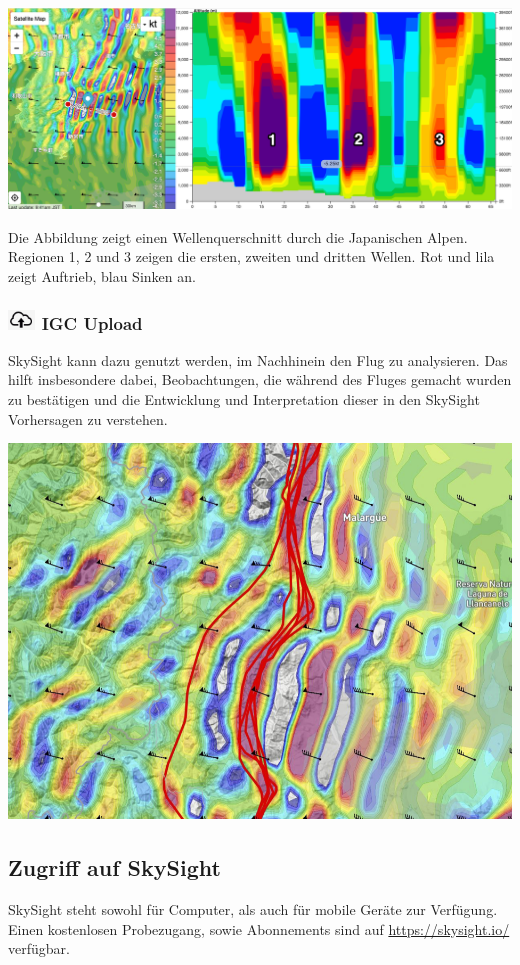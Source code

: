 \documentclass[9pt,a4paper,twocolumn]{article}
\begin{document}
\includegraphics[width=\linewidth]{images/wave_x-section.png}

Die Abbildung zeigt einen Wellenquerschnitt durch die Japanischen Alpen. Regionen 1, 2 und 3 zeigen die ersten, zweiten und dritten Wellen. Rot und lila zeigt Auftrieb, blau Sinken an.


\subsubsection*{\includegraphics[height=15pt]{images/icons/igc.png} IGC Upload}
SkySight kann dazu genutzt werden, im Nachhinein den Flug zu analysieren. Das hilft insbesondere dabei, Beobachtungen, die während des Fluges gemacht wurden zu bestätigen und die Entwicklung und Interpretation dieser in den SkySight Vorhersagen zu verstehen.

\includegraphics[width=\linewidth]{images/igc_upload.png}

\subsection*{Zugriff auf SkySight}
SkySight steht sowohl für Computer, als auch für mobile Geräte zur Verfügung. Einen kostenlosen Probezugang, sowie Abonnements sind auf \url{https://skysight.io/} verfügbar.
\end{document}
